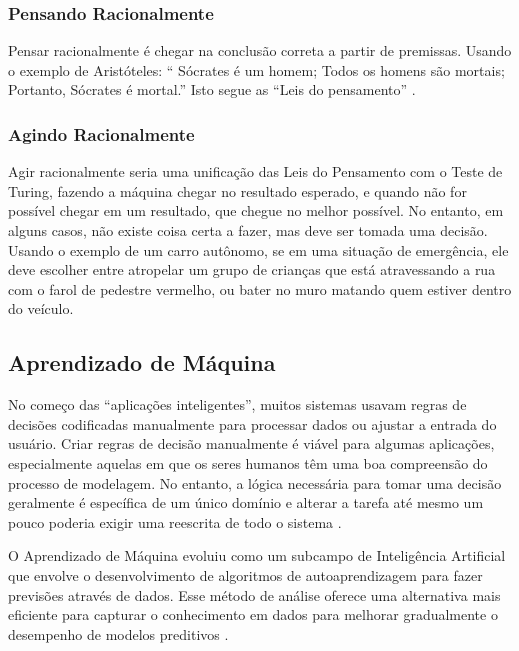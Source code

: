 \documentclass[
	12pt,				%
	openright,			%
	oneside,			%
	a4paper,			%
	english,			%
	spanish,			%
	brazil				%
	]{abntex2}
\begin{document}
	\subsubsection*{Pensando Racionalmente}
		Pensar racionalmente é chegar na conclusão correta a partir de premissas. Usando o exemplo de Aristóteles: ``
Sócrates é um homem; Todos os homens são mortais; Portanto, Sócrates é mortal.''  Isto segue as ``Leis do pensamento''  \cite{laws_of_thought}.
		
	\subsubsection*{Agindo Racionalmente}
		Agir racionalmente seria uma unificação das Leis do Pensamento com o Teste de Turing, fazendo a máquina chegar no resultado esperado, e quando não for possível chegar em um resultado, que chegue no melhor possível. No entanto, em alguns casos, não existe coisa certa a fazer, mas deve ser tomada uma decisão. Usando o exemplo de um carro autônomo, se em uma situação de emergência, ele deve escolher entre atropelar um grupo de crianças que está atravessando a rua com o farol de pedestre vermelho, ou bater no muro matando quem estiver dentro do veículo.
	
	\subsection{Aprendizado de Máquina}
		No começo das ``aplicações inteligentes'', muitos sistemas usavam regras de decisões codificadas manualmente para processar dados ou ajustar a entrada do usuário. Criar regras de decisão manualmente é viável para algumas aplicações, especialmente aquelas em que os seres humanos têm uma boa compreensão do processo de modelagem. No entanto, a lógica necessária para tomar uma decisão geralmente é específica de um único domínio e alterar a tarefa até mesmo um pouco poderia exigir uma reescrita de todo o sistema \cite {guido_muller}.

		O Aprendizado de Máquina evoluiu como um subcampo de Inteligência Artificial que envolve o desenvolvimento de algoritmos de autoaprendizagem para fazer previsões através de dados. Esse método de análise oferece uma alternativa mais eficiente para capturar o conhecimento em dados para melhorar gradualmente o desempenho de modelos preditivos \cite{ r_julian_heart}.
\end{document}
